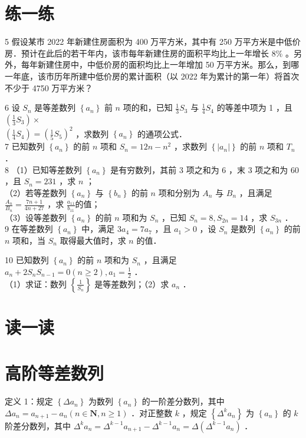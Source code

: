\documentclass[10pt]{article}
\begin{document}
\section*{练一练}
5 假设某市 2022 年新建住房面积为 400 万平方米，其中有 250 万平方米是中低价房．预计在此后的若干年内，该市每年新建住房的面积平均比上一年增长 \(8 \%\) 。另外，每年新建住房中，中低价房的面积均比上一年增加 50 万平方米。那么，到哪一年底，该市历年所建中低价房的累计面积（以 2022 年为累计的第一年）将首次不少于 4750 万平方米？

6 设 \(S_{n}\) 是等差数列 \(\left\{a_{n}\right\}\) 前 \(n\) 项的和，已知 \(\frac{1}{3} S_{3}\) 与 \(\frac{1}{4} S_{4}\) 的等差中项为 1 ，且 \(\left(\frac{1}{3} S_{3}\right) \times\)\\
\(\left(\frac{1}{4} S_{4}\right)=\left(\frac{1}{5} S_{5}\right)^{2}\) ，求数列 \(\left\{a_{n}\right\}\) 的通项公式．\\
7 已知数列 \(\left\{a_{n}\right\}\) 的前 \(n\) 项和 \(S_{n}=12 n-n^{2}\) ，求数列 \(\left\{\left|a_{n}\right|\right\}\) 的前 \(n\) 项和 \(T_{n}\) ．\\
8 （1）已知等差数列 \(\left\{a_{n}\right\}\) 是有穷数列，其前 3 项之和为 6 ，末 3 项之和为 60 ，且 \(S_{n}=231\) ，求 \(n\) ；\\
（2）若等差数列 \(\left\{a_{n}\right\}\) 与 \(\left\{b_{n}\right\}\) 的前 \(n\) 项和分别为 \(A_{n}\) 与 \(B_{n}\) ，且满足 \(\frac{A_{n}}{B_{n}}=\frac{7 n+1}{4 n+27}\) ，求 \(\frac{a_{11}}{b_{11}}\)的值；\\
（3）设等差数列 \(\left\{a_{n}\right\}\) 的前 \(n\) 项和为 \(S_{n}\) ，已知 \(S_{n}=8, S_{2 n}=14\) ，求 \(S_{3 n}\) ．\\
9 在等差数列 \(\left\{a_{n}\right\}\) 中，满足 \(3 a_{4}=7 a_{7}\) ，且 \(a_{1}>0\) ，设 \(S_{n}\) 是数列 \(\left\{a_{n}\right\}\) 的前 \(n\) 项和，当 \(S_{n}\) 取得最大值时，求 \(n\) 的值．

10 已知数列 \(\left\{a_{n}\right\}\) 的前 \(n\) 项和为 \(S_{n}\) ，且满足 \(a_{n}+2 S_{n} S_{n-1}=0(n \geqslant 2), a_{1}=\frac{1}{2}\) ．\\
（1）求证：数列 \(\left\{\frac{1}{S_{n}}\right\}\) 是等差数列；（2）求 \(a_{n}\) ．

\section*{读一读}
\section*{高阶等差数列}
定义 1：规定 \(\left\{\Delta a_{n}\right\}\) 为数列 \(\left\{a_{n}\right\}\) 的一阶差分数列，其中 \(\Delta a_{n}=a_{n+1}-a_{n}(n \in \mathbf{N}, n \geqslant 1)\) ．对正整数 \(k\) ，规定 \(\left\{\Delta^{k} a_{n}\right\}\) 为 \(\left\{a_{n}\right\}\) 的 \(k\) 阶差分数列，其中 \(\Delta^{k} a_{n}=\Delta^{k-1} a_{n+1}-\Delta^{k-1} a_{n}=\Delta\left(\Delta^{k-1} a_{n}\right)\) ．
\end{document}
